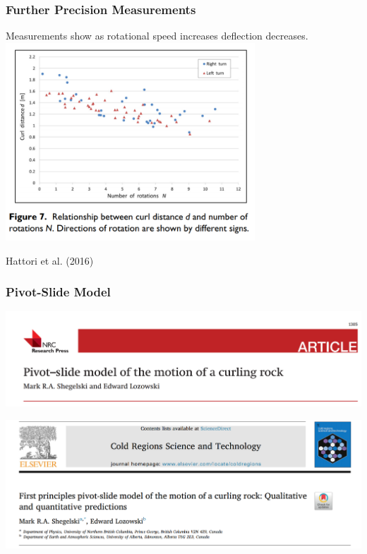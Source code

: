 \documentclass{beamer}
\begin{document}
\begin{frame}\frametitle{Further Precision Measurements}
    Measurements show as rotational speed increases deflection decreases.
    \centering
    \includegraphics[width=0.7\textwidth]{Images/Precision_Mes.png}

    \scriptsize{Hattori et al. (2016)}
\end{frame}

\begin{frame}\frametitle{Pivot-Slide Model}
    \centering
    \includegraphics[width=1.0\textwidth]{Images/Pivot_Title_2016.png}

    \includegraphics[width=1.0\textwidth]{Images/Pivot_Title_2018.png}
\end{frame}
\end{document}
